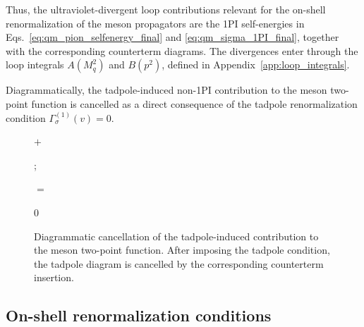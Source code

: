 Thus, the ultraviolet-divergent loop contributions relevant for the
on-shell renormalization of the meson propagators are the 1PI
self-energies in
Eqs.~\eqref{eq:qm_pion_selfenergy_final} and
\eqref{eq:qm_sigma_1PI_final}, together with the corresponding
counterterm diagrams. The divergences enter through the loop integrals
\(A(M_q^2)\) and \(B(p^2)\), defined in
Appendix~\ref{app:loop_integrals}.

Diagrammatically, the tadpole-induced non-1PI contribution to the
meson two-point function is cancelled as a direct consequence of the
tadpole renormalization condition \(\Gamma_\sigma^{(1)}(v)=0\).

\begin{figure}[htbp]
\centering
\begin{minipage}{0.34\textwidth}
\centering
{}
\end{minipage}
\begin{minipage}{0.08\textwidth}
\centering
\(
+
\)
\end{minipage}
\begin{minipage}{0.22\textwidth}
\centering
{};
\end{minipage}
\begin{minipage}{0.07\textwidth}
\centering
\(
=
\)
\end{minipage}
\begin{minipage}{0.04\textwidth}
\centering
\(
0
\)
\end{minipage}
\caption{Diagrammatic cancellation of the tadpole-induced contribution to the meson two-point function. After imposing the tadpole condition, the tadpole diagram is cancelled by the corresponding counterterm insertion.}
\label{fig:qm_two_point_renormalization_structure}
\end{figure}

\subsection*{On-shell renormalization conditions}

